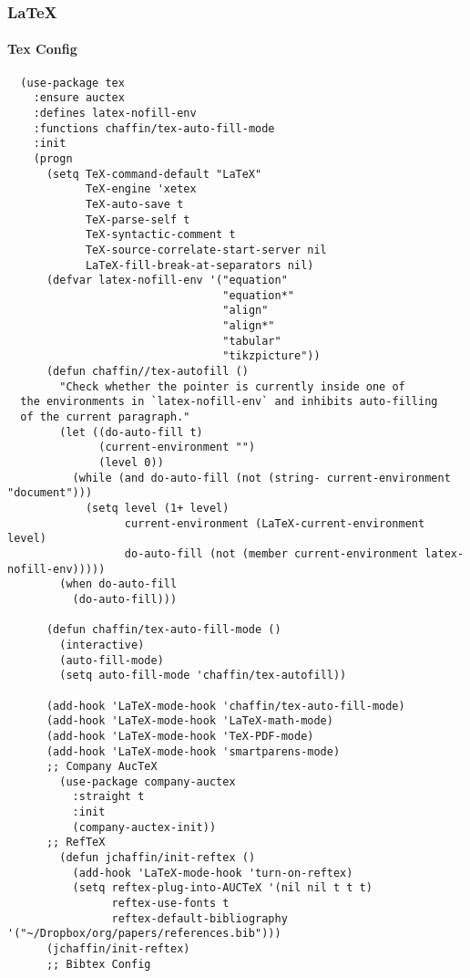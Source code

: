 \documentclass[11pt]{article}
\begin{document}
\subsubsection*{\LaTeX{}}
\label{sec:org60e7524}
\paragraph*{Tex Config}
\label{sec:orgb958070}

\begin{verbatim}
  (use-package tex
    :ensure auctex
    :defines latex-nofill-env
    :functions chaffin/tex-auto-fill-mode
    :init
    (progn
      (setq TeX-command-default "LaTeX"
            TeX-engine 'xetex
            TeX-auto-save t
            TeX-parse-self t
            TeX-syntactic-comment t
            TeX-source-correlate-start-server nil
            LaTeX-fill-break-at-separators nil)
      (defvar latex-nofill-env '("equation"
                                 "equation*"
                                 "align"
                                 "align*"
                                 "tabular"
                                 "tikzpicture"))
      (defun chaffin//tex-autofill ()
        "Check whether the pointer is currently inside one of
  the environments in `latex-nofill-env` and inhibits auto-filling
  of the current paragraph."
        (let ((do-auto-fill t)
              (current-environment "")
              (level 0))
          (while (and do-auto-fill (not (string- current-environment "document")))
            (setq level (1+ level)
                  current-environment (LaTeX-current-environment level)
                  do-auto-fill (not (member current-environment latex-nofill-env)))))
        (when do-auto-fill
          (do-auto-fill)))

      (defun chaffin/tex-auto-fill-mode ()
        (interactive)
        (auto-fill-mode)
        (setq auto-fill-mode 'chaffin/tex-autofill))

      (add-hook 'LaTeX-mode-hook 'chaffin/tex-auto-fill-mode)
      (add-hook 'LaTeX-mode-hook 'LaTeX-math-mode)
      (add-hook 'LaTeX-mode-hook 'TeX-PDF-mode)
      (add-hook 'LaTeX-mode-hook 'smartparens-mode)
      ;; Company AucTeX
        (use-package company-auctex
          :straight t
          :init
          (company-auctex-init))
      ;; RefTeX
        (defun jchaffin/init-reftex ()
          (add-hook 'LaTeX-mode-hook 'turn-on-reftex)
          (setq reftex-plug-into-AUCTeX '(nil nil t t t)
                reftex-use-fonts t
                reftex-default-bibliography '("~/Dropbox/org/papers/references.bib")))
      (jchaffin/init-reftex)
      ;; Bibtex Config


\end{verbatim}
\end{document}
